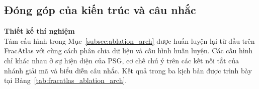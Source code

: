 \subsection{Đóng góp của kiến trúc và câu nhắc}
\label{subsec:fracatlas_ablation}

\noindent\textbf{Thiết kế thí nghiệm}\\
Tám cấu hình trong Mục~\ref{subsec:ablation_arch} được huấn luyện lại từ đầu trên FracAtlas với cùng cách phân chia dữ liệu và cấu hình huấn luyện. Các cấu hình chỉ khác nhau ở sự hiện diện của PSG, cơ chế chú ý trên các kết nối tắt của nhánh giải mã và biểu diễn câu nhắc. Kết quả trong ba kịch bản được trình bày tại Bảng~\ref{tab:fracatlas_ablation_arch}.

\begin{table}[H]
    \centering
    \caption{Kết quả chỉ số Dice của nghiên cứu loại bỏ thành phần trên FracAtlas trong ba kịch bản câu nhắc (N=\NtestimgFA~ảnh)}
    \label{tab:fracatlas_ablation_arch}
    \renewcommand{\arraystretch}{1.3}
\end{table}

